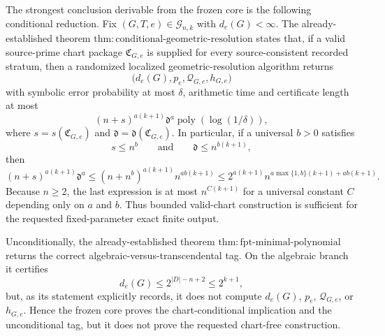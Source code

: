 The strongest conclusion derivable from the frozen core is the following conditional reduction.  Fix \((G,T,e)\in\mathcal G_{n,k}\) with \(d_e(G)<\infty\).  The already-established theorem \(\mathrm{thm:conditional\mbox{-}geometric\mbox{-}resolution}\) states that, if a valid source-prime chart package \(\mathfrak C_{G,e}\) is supplied for every source-consistent recorded stratum, then a randomized localized geometric-resolution algorithm returns
\[
\bigl(d_e(G),p_e,\mathcal Q_{G,e},h_{G,e}\bigr)
\]
with symbolic error probability at most \(\delta\), arithmetic time and certificate length at most
\[
(n+s)^{a(k+1)}\mathfrak d^{a}\operatorname{poly}\!\left(\log(1/\delta)\right),
\]
where \(s=s(\mathfrak C_{G,e})\) and \(\mathfrak d=\mathfrak d(\mathfrak C_{G,e})\).  In particular, if a universal \(b>0\) satisfies
\[
s\leq n^b
\qquad\text{and}\qquad
\mathfrak d\leq n^{b(k+1)},
\]
then
\[
(n+s)^{a(k+1)}\mathfrak d^{a}
\leq
(n+n^b)^{a(k+1)}n^{ab(k+1)}
\leq
2^{a(k+1)}n^{a\max\{1,b\}(k+1)+ab(k+1)}.
\]
Because \(n\geq2\), the last expression is at most \(n^{C(k+1)}\) for a universal constant \(C\) depending only on \(a\) and \(b\).  Thus bounded valid-chart construction is sufficient for the requested fixed-parameter exact finite output.

Unconditionally, the already-established theorem \(\mathrm{thm:fpt\mbox{-}minimal\mbox{-}polynomial}\) returns the correct algebraic-versus-transcendental tag.  On the algebraic branch it certifies
\[
d_e(G)\leq 2^{|D|-n+2}\leq2^{k+1},
\]
but, as its statement explicitly records, it does not compute \(d_e(G)\), \(p_e\), \(\mathcal Q_{G,e}\), or \(h_{G,e}\).  Hence the frozen core proves the chart-conditional implication and the unconditional tag, but it does not prove the requested chart-free construction.
